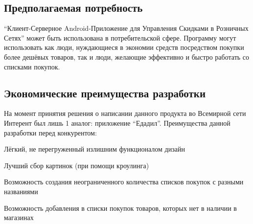 \subsection{Предполагаемая потребность} ``Клиент-Серверное Android-Приложение
для Управления Скидками в Розничных Сетях'' может быть использована в
потребительской сфере. Программу могут использовать как люди, нуждающиеся в
экономии средств посредством покупки более дешёвых товаров, так и люди,
желающие эффективно и быстро работать со списками покупок.

\subsection{Экономические преимущества разработки} На момент принятия решения о
написании данного продукта во Всемирной сети Интерент был лишь 1 аналог: приложение ``Едадил''.  Преимущества данной разработки перед конкурентом:
\begin{my_enumerate}
\item Лёгкий, не перегруженный излишним функционалом дизайн
\item Лучший сбор картинок (при помощи кроулинга)
\item Возможность создания неограниченного количества списков покупок с разными названиями
\item Возможность добавления в списки покупок товаров, которых нет в наличии в магазинах
\end{my_enumerate}

